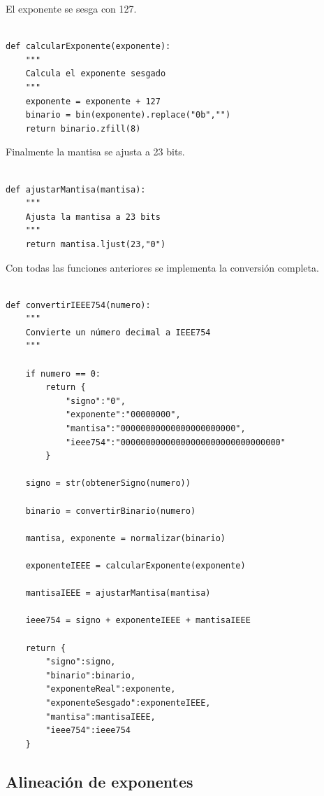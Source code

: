 \documentclass[11pt]{article}
\begin{document}
El exponente se sesga con 127.

\begin{verbatim}

def calcularExponente(exponente):
    """
    Calcula el exponente sesgado
    """
    exponente = exponente + 127
    binario = bin(exponente).replace("0b","")
    return binario.zfill(8)

\end{verbatim}

Finalmente la mantisa se ajusta a 23 bits.

\begin{verbatim}

def ajustarMantisa(mantisa):
    """
    Ajusta la mantisa a 23 bits
    """
    return mantisa.ljust(23,"0")

\end{verbatim}

Con todas las funciones anteriores se implementa la conversión completa.

\begin{verbatim}

def convertirIEEE754(numero):
    """
    Convierte un número decimal a IEEE754
    """

    if numero == 0:
        return {
            "signo":"0",
            "exponente":"00000000",
            "mantisa":"00000000000000000000000",
            "ieee754":"00000000000000000000000000000000"
        }

    signo = str(obtenerSigno(numero))

    binario = convertirBinario(numero)

    mantisa, exponente = normalizar(binario)

    exponenteIEEE = calcularExponente(exponente)

    mantisaIEEE = ajustarMantisa(mantisa)

    ieee754 = signo + exponenteIEEE + mantisaIEEE

    return {
        "signo":signo,
        "binario":binario,
        "exponenteReal":exponente,
        "exponenteSesgado":exponenteIEEE,
        "mantisa":mantisaIEEE,
        "ieee754":ieee754
    }

\end{verbatim}

\subsection{Alineación de exponentes}
\label{sec:orge537be1}
\end{document}
